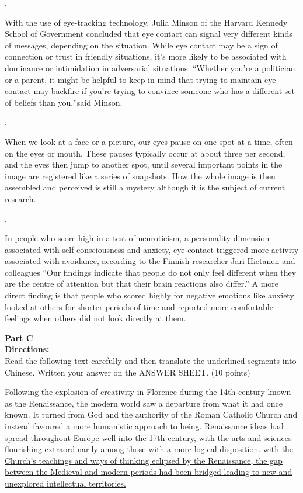 \linefill.

With the use of eye-tracking technology, Julia Minson of the Harvard
Kennedy School of Government concluded that eye contact can signal very
different kinds of messages, depending on the situation. While eye
contact may be a sign of connection or trust in friendly situations,
it's more likely to be associated with dominance or intimidation in
adversarial situations. ``Whether you're a politician or a parent, it
might be helpful to keep in mind that trying to maintain eye contact may
backfire if you're trying to convince someone who has a different set of
beliefs than you,''said Minson.


\linefill.

When we look at a face or a picture, our eyes pause on one spot at a
time, often on the eyes or mouth. These pauses typically occur at about
three per second, and the eyes then jump to another spot, until several
important points in the image are registered like a series of snapshots.
How the whole image is then assembled and perceived is still a mystery
although it is the subject of current research.


\linefill.

In people who score high in a test of neuroticism, a personality
dimension associated with self-consciousness and anxiety, eye contact
triggered more activity associated with avoidance, according to the
Finnish researcher Jari Hietanen and colleagues ``Our findings indicate
that people do not only feel different when they are the centre of
attention but that their brain reactions also differ.'' A more direct
finding is that people who scored highly for negative emotions like
anxiety looked at others for shorter periods of time and reported more
comfortable feelings when others did not look directly at them.


\newpage
\noindent
\textbf{Part C}\\
\textbf{Directions:}\\
Read the following text carefully and then translate the underlined
segments into Chinese.   Written your answer on the
ANSWER SHEET. (10 points)


\TiGanSpace

Following the explosion of creativity in Florence during the 14th
century known as the Renaissance, the modern world saw a departure from
what it had once known. It turned from God and the authority of the
Roman Catholic Church and instead favoured a more humanistic approach to
being. Renaissance ideas had spread throughout Europe well into the 17th
century, with the arts and sciences flourishing extraordinarily among
those with a more logical disposition. \transnum \uline{with the Church's
teachings and ways of thinking eclipsed by the Renaissance, the gap
between the Medieval and modern periods had been bridged leading to new
and unexplored intellectual territories.}

